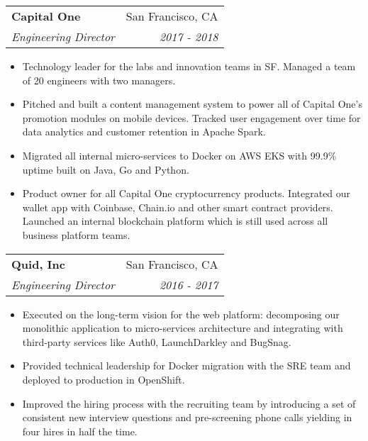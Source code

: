 \documentclass[letterpaper,11pt]{article}
\makeatletter
\newcommand{\resumeSubheading}[4]{
  \vspace{-1pt}\item
    \begin{tabular*}{0.97\textwidth}[t]{l@{\extracolsep{\fill}}r}
      \textbf{#1} & #2 \\
      \textit{\small#3} & \textit{\small #4} \\
    \end{tabular*}\vspace{-5pt}
}
\newcommand{\resumeItemListStart}{\begin{itemize}}
\newcommand{\resumeItemListEnd}{\end{itemize}\vspace{-5pt}}
\makeatother
\begin{document}
    \resumeSubheading
    {Capital One}{San Francisco, CA}
    {Engineering Director}{2017 - 2018}
    \resumeItemListStart
      \item Technology leader for the labs and innovation teams in SF. Managed a team of 20 engineers with two managers.
      \item Pitched and built a content management system to power all of Capital One’s promotion modules on mobile devices. Tracked user engagement over time for data analytics and customer retention in Apache Spark.
      \item Migrated all internal micro-services to Docker on AWS EKS with 99.9\% uptime built on Java, Go and Python.
      \item Product owner for all Capital One cryptocurrency products. Integrated our wallet app with Coinbase, Chain.io and other smart contract providers. Launched an internal blockchain platform which is still used across all business platform teams.
    \resumeItemListEnd

    \resumeSubheading
    {Quid, Inc}{San Francisco, CA}
    {Engineering Director}{2016 - 2017}
    \resumeItemListStart
      \item Executed on the long-term vision for the web platform: decomposing our monolithic application to micro-services architecture and integrating with third-party services like Auth0, LaunchDarkley and BugSnag.
      \item Provided technical leadership for Docker migration with the SRE team and deployed to production in OpenShift.
      \item Improved the hiring process with the recruiting team by introducing a set of consistent new interview questions and pre-screening phone calls yielding in four hires in half the time.
    \resumeItemListEnd
\end{document}
